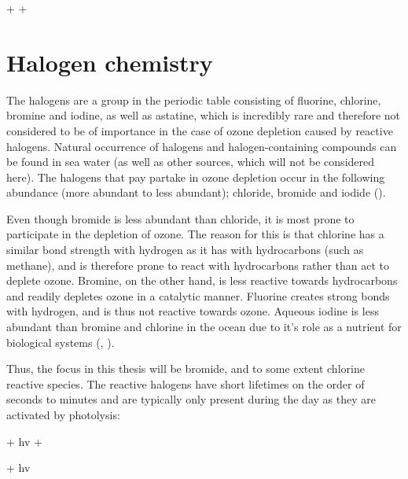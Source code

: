 \begin{reaction}
     +  \rightarrow {} + 
    \label{rqn:o3no}
\end{reaction}




\section{Halogen chemistry}


The halogens are a group in the periodic table consisting of fluorine, chlorine, bromine and iodine, as well as astatine, which is incredibly rare and therefore not considered to be of importance in the case of ozone depletion caused by reactive halogens. Natural occurrence of halogens and halogen-containing compounds can be found in sea water (as well as other sources, which will not be considered here). The halogens that pay partake in ozone depletion occur in the following abundance (more abundant to less abundant); chloride, bromide and iodide (\cite{Simpson2015}). 

\medskip

Even though bromide is less abundant than chloride, it is most prone to participate in the depletion of ozone. The reason for this is that chlorine has a similar bond strength with hydrogen as it has with hydrocarbons (such as methane), and is therefore prone to react with hydrocarbons rather than act to deplete ozone. Bromine, on the other hand, is less reactive towards hydrocarbons and readily depletes ozone in a catalytic manner.  Fluorine creates strong bonds with hydrogen, and is thus not reactive towards ozone. Aqueous iodine is less abundant than bromine and chlorine in the ocean due to it's role as a nutrient for biological systems (\cite{FinlaysonPitts2010}, \cite{Simpson2015}). 

\medskip

Thus, the focus in this thesis will be bromide, and to some extent chlorine reactive species. The reactive halogens have short lifetimes on the order of seconds to minutes and are typically only present during the day as they are activated by photolysis:



\begin{reaction}
     + hv \rightarrow {} + 
    \label{R:19}
\end{reaction}

\begin{reaction}
     + hv 
\end{reaction}

